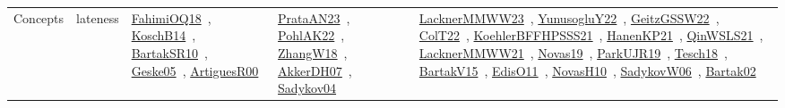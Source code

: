 {\begin{longtable}{lp{3cm}>{\raggedright\arraybackslash}p{6cm}>{\raggedright\arraybackslash}p{6cm}>{\raggedright\arraybackslash}p{8cm}}
Concepts & lateness & \href{works/FahimiOQ18.pdf}{FahimiOQ18}~\cite{FahimiOQ18}, \href{works/KoschB14.pdf}{KoschB14}~\cite{KoschB14}, \href{works/BartakSR10.pdf}{BartakSR10}~\cite{BartakSR10}, \href{works/Geske05.pdf}{Geske05}~\cite{Geske05}, \href{works/ArtiguesR00.pdf}{ArtiguesR00}~\cite{ArtiguesR00} & \href{works/PrataAN23.pdf}{PrataAN23}~\cite{PrataAN23}, \href{works/PohlAK22.pdf}{PohlAK22}~\cite{PohlAK22}, \href{works/ZhangW18.pdf}{ZhangW18}~\cite{ZhangW18}, \href{works/AkkerDH07.pdf}{AkkerDH07}~\cite{AkkerDH07}, \href{works/Sadykov04.pdf}{Sadykov04}~\cite{Sadykov04} & \href{works/LacknerMMWW23.pdf}{LacknerMMWW23}~\cite{LacknerMMWW23}, \href{works/YunusogluY22.pdf}{YunusogluY22}~\cite{YunusogluY22}, \href{works/GeitzGSSW22.pdf}{GeitzGSSW22}~\cite{GeitzGSSW22}, \href{works/ColT22.pdf}{ColT22}~\cite{ColT22}, \href{works/KoehlerBFFHPSSS21.pdf}{KoehlerBFFHPSSS21}~\cite{KoehlerBFFHPSSS21}, \href{works/HanenKP21.pdf}{HanenKP21}~\cite{HanenKP21}, \href{works/QinWSLS21.pdf}{QinWSLS21}~\cite{QinWSLS21}, \href{works/LacknerMMWW21.pdf}{LacknerMMWW21}~\cite{LacknerMMWW21}, \href{works/Novas19.pdf}{Novas19}~\cite{Novas19}, \href{works/ParkUJR19.pdf}{ParkUJR19}~\cite{ParkUJR19}, \href{works/Tesch18.pdf}{Tesch18}~\cite{Tesch18}, \href{works/BartakV15.pdf}{BartakV15}~\cite{BartakV15}, \href{works/EdisO11.pdf}{EdisO11}~\cite{EdisO11}, \href{works/NovasH10.pdf}{NovasH10}~\cite{NovasH10}, \href{works/SadykovW06.pdf}{SadykovW06}~\cite{SadykovW06}, \href{works/Bartak02.pdf}{Bartak02}~\cite{Bartak02}\\

\end{longtable}}
